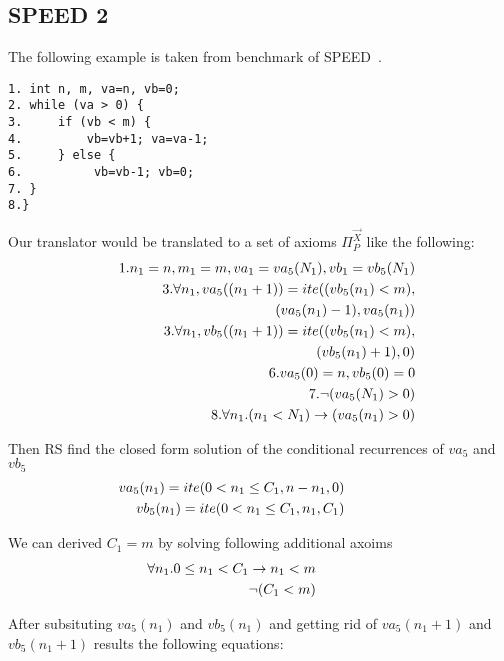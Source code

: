 \subsection{SPEED 2}

The following example is taken from benchmark of SPEED~\cite{speed1}.
\begin{verbatim}
1. int n, m, va=n, vb=0;
2. while (va > 0) {
3.     if (vb < m) { 
4.         vb=vb+1; va=va-1;
5.     } else {
6.          vb=vb-1; vb=0;
7. }
8.}
\end{verbatim}




Our translator would be translated to a set of axioms $\Pi_P^{\vec{X}}$ like the following:
\begin{eqnarray*}
	&&1. n_1 = n, m_1 = m, va_1 = va_5(N_1), vb_1 = vb_5(N_1)\\
	&&3.\forall n_1,va_5((n_1+1)) = ite((vb_5(n_1)<m),\\ &&\hspace*{5em}(va_5(n_1)-1),va_5(n_1))\\ 
	&&3.\forall n_1,vb_5((n_1+1)) = ite((vb_5(n_1)<m),\\ &&\hspace*{5em}(vb_5(n_1)+1),0)\\
	&&6.va_5(0) = n, vb_5(0) = 0\\
	&&7.\neg (va_5(N_1)>0)\\
	&&8.\forall n_1.(n_1<N_1) \rightarrow (va_5(n_1)>0)
\end{eqnarray*}

Then RS find the closed form solution of the conditional recurrences of $va_5$ and $vb_5$
\begin{eqnarray*}
	&&\hspace*{-5em}va_5(n_1)=ite(0<n_1\leq C_1,n-n_1,0)\\
	&&\hspace*{-5em}vb_5(n_1)=ite(0<n_1\leq C_1,n_1,C_1)
\end{eqnarray*}

We can derived $C_1=m$ by solving following additional axoims
\begin{eqnarray*}
	&&\hspace*{-5em}\forall n_1. 0 \leq n_1<C_1 \rightarrow n_1<m \\
	&&\hspace*{-5em}\neg (C_1 < m)
\end{eqnarray*}

After subsituting $va_5(n_1)$ and $vb_5(n_1)$ and getting rid of $va_5(n_1+1)$ and $vb_5(n_1+1)$ results the following equations:

